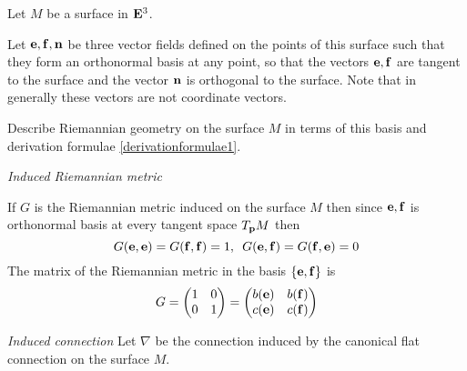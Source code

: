\documentclass[12pt]{article}
\theoremstyle{theorem}
\numberwithin{equation}{section}
\begin{document}
{   Let $M$ be a surface in ${\bf E}^3$.

          Let ${{\bf e},{\bf f},{\bf n}}$ be three vector fields defined on the points of this surface
   such that they form an orthonormal basis at any point, so that the vectors ${\bf e},{\bf f}$ are tangent to the surface
   and  the vector ${\bf n}$ is orthogonal to the surface.
   Note that in generally these vectors are not coordinate vectors.

     Describe  Riemannian geometry on the surface
     $M$ in terms of this basis and derivation formulae \eqref{derivationformulae1}.




    \m



    {\it Induced Riemannian metric}

    If $G$ is the Riemannian metric induced on the surface $M$ then since ${\bf e},{\bf f}$ is orthonormal basis
    at every tangent space $T_{\bf p} M$ then
        \begin{equation}\label{inducriemmetricinnonholonombasis}
        G({\bf e},{\bf e})=G({\bf f},{\bf f})=1,\,\,\,G({\bf e},{\bf f})=G({\bf f},{\bf e})=0
        \end{equation}
       The matrix of the Riemannian metric in the basis $\{{\bf e},{\bf f}\}$ is
     \begin{equation}\label{inducedriemmetricinnonholonombasis2}
        G=
        \begin{pmatrix}
        1& 0\cr
        0& 1\cr
        \end{pmatrix}
        =
        \begin{pmatrix}
        b({\bf e})&  b({\bf f})\cr
        c({\bf e})& c({\bf f})\cr
        \end{pmatrix}
     \end{equation}


      \m


    {\it Induced connection}
    Let $\nabla$ be the connection induced by the canonical flat connection on the surface $M$.

}
\end{document}
